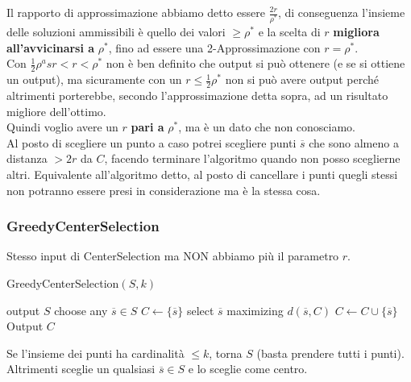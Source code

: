 \documentclass[11pt]{article}
\begin{document}
	\newpage
	
	Il rapporto di approssimazione abbiamo detto essere $\frac{2r}{\rho^\ast}$, di conseguenza l'insieme delle soluzioni ammissibili è quello dei valori $\geq \rho^\ast$ e la scelta di $r$ \textbf{migliora all'avvicinarsi a} $\rho^\ast$, fino ad essere una 2-Approssimazione con $r = \rho^\ast$.\\
	
	Con $ \frac{1}{2}\rho^asr < r < \rho^\ast$ non è ben definito che output si può ottenere (e se si ottiene un output), ma sicuramente con un $r \leq \frac{1}{2} \rho^\ast$ non si può avere output perché altrimenti porterebbe, secondo l'approssimazione detta sopra, ad un risultato migliore dell'ottimo.\\
	
	Quindi voglio avere un $r$ \textbf{pari a} $\rho^\ast$, ma è un dato che non conosciamo.\\
	
	Al posto di scegliere un punto a caso potrei scegliere punti $\overline{s}$ che sono almeno a distanza $> 2r$ da $C$, facendo terminare l'algoritmo quando non posso sceglierne altri. Equivalente all'algoritmo detto, al posto di cancellare i punti quegli stessi non potranno essere presi in considerazione ma è la stessa cosa.\\
	
	\newpage
	
	\subsubsection{GreedyCenterSelection}
	Stesso input di CenterSelection ma NON abbiamo più il parametro $r$.\\
	
		\begin{algorithm}
		\caption{GreedyCenterSelection$(S, k)$}
		\begin{algorithmic}
				\STATE output $S$
			\ENDIF
			\STATE choose any $\overline{s} \in S$
			\STATE $C \leftarrow \{ \overline{s}\}$ 
				\STATE select $\overline{s}$ maximizing $d(\overline{s}, C)$
				\STATE $C \leftarrow C \cup \{\overline{s}\}$
			\ENDWHILE
			\STATE Output $C$
		\end{algorithmic}
	\end{algorithm}
	
	
	Se l'insieme dei punti ha cardinalità $\leq k$, torna $S$ (basta prendere tutti i punti). Altrimenti sceglie un qualsiasi $\overline{s} \in S$ e lo sceglie come centro.\\
	
\end{document}
